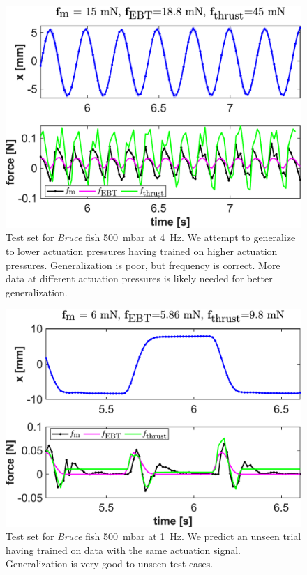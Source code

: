 \iffalse
\begin{figure}[htb]
    \centering
    \includegraphics[width=0.8\columnwidth]{figures_appendix/error_analysis_500_mbar_4_Hz.pdf}
    \caption{Test set for \emph{Bruce} fish \SI{500}{mbar} at \SI{4}{Hz}. We attempt to generalize to lower actuation pressures having trained on higher actuation pressures. Generalization is poor, but frequency is correct. More data at different actuation pressures is likely needed for better generalization.}
    \label{fig:Bruce1}
\end{figure}
\begin{figure}[h]
    \centering
    \includegraphics[width=0.8\columnwidth]{figures_appendix/error_analysis_500_mbar_1_Hz.pdf}
    \caption{Test set for \emph{Bruce} fish \SI{500}{mbar} at \SI{1}{Hz}. We predict an unseen trial having trained on data with the same actuation signal. Generalization is very good to unseen test cases.}
    \label{fig:Bruce2}
\end{figure}
